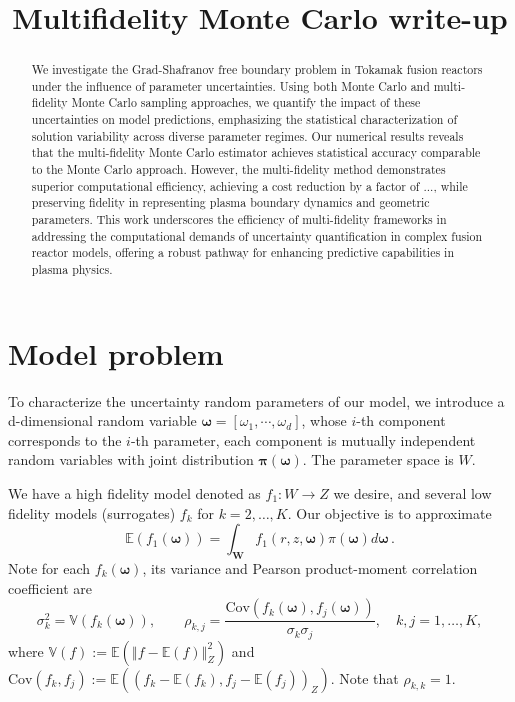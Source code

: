 \documentclass[final,3p,times,11pt]{elsarticle}
\begin{document}
\begin{frontmatter}
\title{Multifidelity Monte Carlo write-up}


\begin{abstract}
We investigate the Grad-Shafranov free boundary problem in Tokamak fusion reactors under the influence of parameter uncertainties. Using both Monte Carlo and multi-fidelity Monte Carlo sampling approaches, we quantify the impact of these uncertainties on model predictions, emphasizing the statistical characterization of solution variability across diverse parameter regimes. Our numerical results reveals that the multi-fidelity Monte Carlo estimator achieves statistical accuracy comparable to the Monte Carlo approach. However, the multi-fidelity method demonstrates superior computational efficiency, achieving a cost reduction by a factor of ..., while preserving fidelity in representing plasma boundary dynamics and geometric parameters. This work underscores the efficiency of multi-fidelity frameworks in addressing the computational demands of uncertainty quantification in complex fusion reactor models, offering a robust pathway for enhancing predictive capabilities in plasma physics. 
\end{abstract}
\end{frontmatter}


\section{Model problem}\label{sec:Problem_setup}
To characterize the uncertainty random parameters of our model, we introduce a d-dimensional random variable 
$\boldsymbol{\omega}=[\omega_1,\cdots, \omega_{d}]$, whose $i$-th component corresponds to the $i$-th parameter, each component is mutually independent random variables with joint distribution $\boldsymbol\pi(\boldsymbol{\omega})$. The parameter space is $W$.


We have a high fidelity model denoted as $f_1: W \rightarrow Z$ we desire, and several low fidelity models (surrogates) $f_k$ for $k=2,\ldots,K$. Our objective is to approximate 
\[
\mathbb{E}\left(f_1(\boldsymbol{\omega})\right)=\int_{\boldsymbol W} f_1(r,z,\boldsymbol{\omega})\pi(\boldsymbol\omega)d\boldsymbol{\omega}\,.
\]
Note for each $f_k(\boldsymbol{\omega})$, its variance and Pearson product-moment correlation coefficient are 
\begin{equation*}
    \sigma_k^2 = \mathbb{V}\left(f_k(\boldsymbol{\omega})\right),\qquad \rho_{k,j} = \frac{\text{Cov}\left(f_k(\boldsymbol{\omega}),f_j(\boldsymbol{\omega})\right)}{\sigma_k\sigma_j}, \quad k,j=1,\dots, K,
\end{equation*}
where $\mathbb{V}(f) := \mathbb{E}\left(\left\Vert f - \mathbb{E}(f)\right\Vert_Z^2\right)$ and $\text{Cov}\left(f_k,f_j\right) := \mathbb{E}\left(\left( f_k - \mathbb{E}(f_k), f_j - \mathbb{E}(f_j)\right)_Z\right)$. Note that $\rho_{k,k}=1$.
\end{document}
